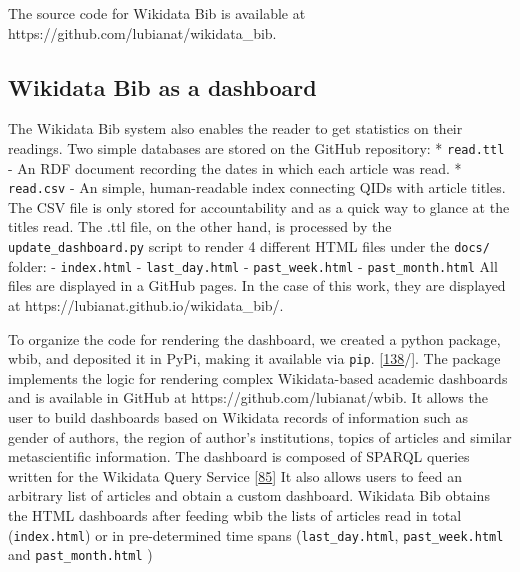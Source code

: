 The source code for Wikidata Bib is available at https://github.com/lubianat/wikidata\_bib.

\hypertarget{wikidata-bib-as-a-dashboard}{%
\subsection{Wikidata Bib as a dashboard}\label{wikidata-bib-as-a-dashboard}}

The Wikidata Bib system also enables the reader to get statistics on their readings.
Two simple databases are stored on the GitHub repository:
* \texttt{read.ttl} - An RDF document recording the dates in which each article was read.
* \texttt{read.csv} - An simple, human-readable index connecting QIDs with article titles.
The CSV file is only stored for accountability and as a quick way to glance at the titles read.
The .ttl file, on the other hand, is processed by the \texttt{update\_dashboard.py} script to render 4 different HTML files under the \texttt{docs/} folder:
- \texttt{index.html}
- \texttt{last\_day.html}
- \texttt{past\_week.html}
- \texttt{past\_month.html}
All files are displayed in a GitHub pages.
In the case of this work, they are displayed at https://lubianat.github.io/wikidata\_bib/.

To organize the code for rendering the dashboard, we created a python package, wbib, and deposited it in PyPi, making it available via \texttt{pip}. {[}\protect\hyperlink{ref-6chnW6cc}{138}/{]}.
The package implements the logic for rendering complex Wikidata-based academic dashboards and is available in GitHub at https://github.com/lubianat/wbib.
It allows the user to build dashboards based on Wikidata records of information such as gender of authors, the region of author's institutions, topics of articles and similar metascientific information.
The dashboard is composed of SPARQL queries written for the Wikidata Query Service {[}\protect\hyperlink{ref-2wDsXBwd}{85}{]}
It also allows users to feed an arbitrary list of articles and obtain a custom dashboard.
Wikidata Bib obtains the HTML dashboards after feeding wbib the lists of articles read in total (\texttt{index.html}) or in pre-determined time spans (\texttt{last\_day.html}, \texttt{past\_week.html} and \texttt{past\_month.html} )

